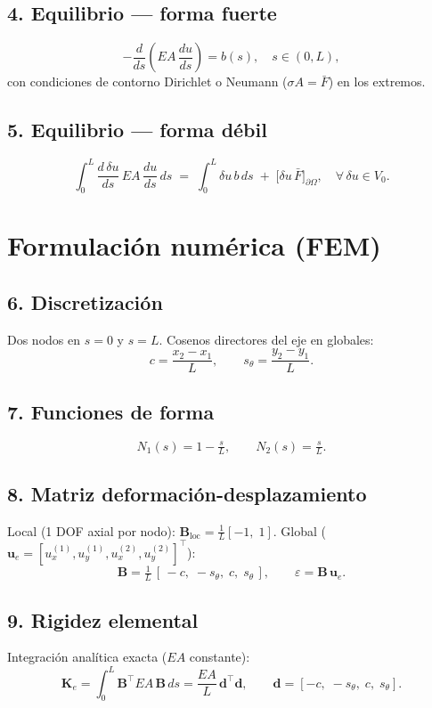\documentclass[11pt,letterpaper,oneside]{report}
\begin{document}
\subsection{4. Equilibrio --- forma fuerte}
\[
-\frac{d}{ds}\!\left(EA\,\frac{du}{ds}\right) = b(s), \quad s \in (0, L),
\]
con condiciones de contorno Dirichlet o Neumann ($\sigma A = \bar F$) en los extremos.

\subsection{5. Equilibrio --- forma débil}
\[
\int_0^L \frac{d\,\delta u}{ds}\, EA\, \frac{du}{ds}\, ds \;=\; \int_0^L \delta u\, b\, ds \;+\; \bigl[\delta u\, \bar F\bigr]_{\partial \Omega}, \quad \forall\, \delta u \in V_0.
\]


\section{Formulación numérica (FEM)}

\subsection{6. Discretización}
Dos nodos en $s = 0$ y $s = L$. Cosenos directores del eje en globales:
\[
c = \frac{x_2 - x_1}{L}, \qquad s_\theta = \frac{y_2 - y_1}{L}.
\]

\subsection{7. Funciones de forma}
\[
N_1(s) = 1 - \tfrac{s}{L}, \qquad N_2(s) = \tfrac{s}{L}.
\]

\subsection{8. Matriz deformación-desplazamiento}
Local (1 DOF axial por nodo): $\mathbf B_{\text{loc}} = \tfrac{1}{L}[-1,\; 1]$.
Global ($\mathbf u_e = [u_x^{(1)}, u_y^{(1)}, u_x^{(2)}, u_y^{(2)}]^\top$):
\[
\mathbf B = \tfrac{1}{L}\,[\,-c,\; -s_\theta,\; c,\; s_\theta\,], \qquad \varepsilon = \mathbf B\, \mathbf u_e.
\]

\subsection{9. Rigidez elemental}
Integración analítica exacta ($EA$ constante):
\[
\mathbf K_e = \int_0^L \mathbf B^\top EA\, \mathbf B\, ds = \frac{EA}{L}\, \mathbf d^\top \mathbf d, \qquad \mathbf d = [-c,\; -s_\theta,\; c,\; s_\theta].
\]
\end{document}
